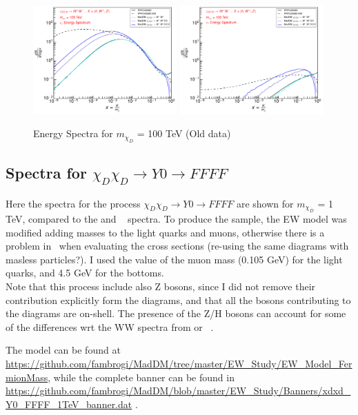 \documentclass[epj,nopacs,fleqn]{svjour}
\begin{document}
\begin{figure}[!b]
\subfigure
{ \includegraphics[width=0.49\textwidth]{Fig/100TeV_OLD/OLD_100000_neutrinos_mu_PPPC_Comparison_xdxd_100000.pdf}}
\subfigure
{ \includegraphics[width=0.49\textwidth]{Fig/100TeV_OLD/OLD_100000_neutrinos_tau_PPPC_Comparison_xdxd_100000.pdf}}
\caption{Energy Spectra for $m_{\chi_D}$ = 100 TeV (Old data)}
\end{figure}
%

\clearpage
\subsection{Spectra for $\chi_D \chi_D \rightarrow Y0 \rightarrow FFFF$}

Here the spectra for the process $\chi_D \chi_D \rightarrow Y0 \rightarrow FFFF$ are shown for $m_{\chi_D}$ = 1 TeV, compared to the \PPPC and \PPPCew~ spectra. To produce the sample, the EW model was modified adding masses to the light quarks and muons, otherwise there is a problem in \MG~when evaluating the cross sections (re-using the same diagrams with masless particles?). I used the value of the muon mass (0.105 GeV) for the light quarks, and 4.5 GeV for the bottoms. \\
Note that this process include also Z bosons, since I did not remove their contribution explicitly form the diagrams, and that all the bosons contributing to the diagrams are on-shell. The presence of the Z/H bosons can account for some of the differences wrt the WW spectra from \PPPC or \PPPCew~.

The model can be found at {\color{blue} \url{https://github.com/fambrogi/MadDM/tree/master/EW_Study/EW_Model_FermionMass}}, while the complete banner can be found in {\color{blue} \url{https://github.com/fambrogi/MadDM/blob/master/EW_Study/Banners/xdxd_Y0_FFFF_1TeV_banner.dat} }.
\\
\end{document}
